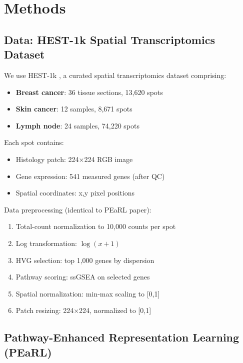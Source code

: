 \documentclass[conference]{IEEEtran}
\begin{document}
\section{Methods}

\subsection{Data: HEST-1k Spatial Transcriptomics Dataset}

We use HEST-1k \cite{hest2024}, a curated spatial transcriptomics dataset comprising:
\begin{itemize}
\item \textbf{Breast cancer}: 36 tissue sections, 13,620 spots
\item \textbf{Skin cancer}: 12 samples, 8,671 spots
\item \textbf{Lymph node}: 24 samples, 74,220 spots
\end{itemize}

Each spot contains:
\begin{itemize}
\item Histology patch: 224×224 RGB image
\item Gene expression: 541 measured genes (after QC)
\item Spatial coordinates: x,y pixel positions
\end{itemize}

Data preprocessing (identical to PEaRL paper):
\begin{enumerate}
\item Total-count normalization to 10,000 counts per spot
\item Log transformation: $\log(x+1)$
\item HVG selection: top 1,000 genes by dispersion
\item Pathway scoring: ssGSEA on selected genes
\item Spatial normalization: min-max scaling to [0,1]
\item Patch resizing: 224×224, normalized to [0,1]
\end{enumerate}

\subsection{Pathway-Enhanced Representation Learning (PEaRL)}
\end{document}
